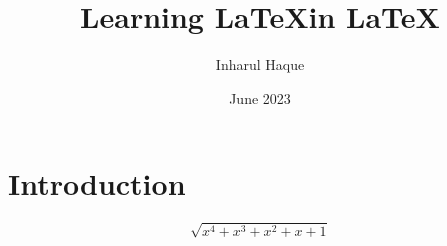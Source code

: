 \documentclass{book}
\title{\Huge{\textbf{Learning \LaTeX  in \LaTeX}}}
\author{\Large{Inharul Haque}}
\date{June 2023}
\begin{document}
\maketitle

\section{Introduction}
\begin{equation}
    \sqrt{x^4+x^3+x^2+x+1}
\end{equation}
\end{document}
